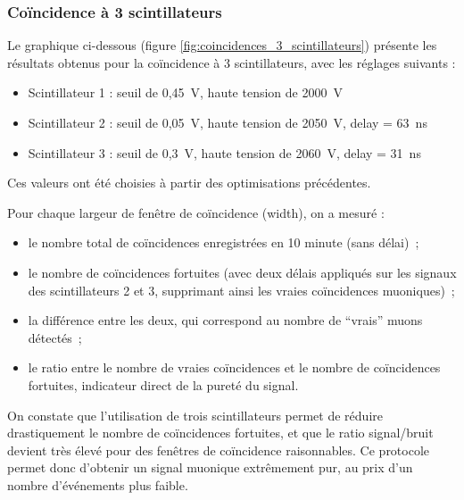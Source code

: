 \documentclass[a4paper,12pt,twoside]{article}
\begin{document}
\subsubsection{Coïncidence à 3 scintillateurs}

Le graphique ci-dessous (figure \ref{fig:coincidences_3_scintillateurs}) présente les résultats obtenus pour la coïncidence à 3 scintillateurs, avec les réglages suivants :
\begin{itemize}
    \item Scintillateur 1 : seuil de 0{,}45~V, haute tension de 2000~V
    \item Scintillateur 2 : seuil de 0{,}05~V, haute tension de 2050~V, delay = 63~ns
    \item Scintillateur 3 : seuil de 0{,}3~V, haute tension de 2060~V, delay = 31~ns
\end{itemize}
Ces valeurs ont été choisies à partir des optimisations précédentes.

Pour chaque largeur de fenêtre de coïncidence (width), on a mesuré :
\begin{itemize}
    \item le nombre total de coïncidences enregistrées en 10 minute (sans délai)~;
    \item le nombre de coïncidences fortuites (avec deux délais appliqués sur les signaux des scintillateurs 2 et 3, supprimant ainsi les vraies coïncidences muoniques)~;
    \item la différence entre les deux, qui correspond au nombre de “vrais” muons détectés~;
    \item le ratio entre le nombre de vraies coïncidences et le nombre de coïncidences fortuites, indicateur direct de la pureté du signal.
\end{itemize}

On constate que l’utilisation de trois scintillateurs permet de réduire drastiquement le nombre de coïncidences fortuites, et que le ratio signal/bruit devient très élevé pour des fenêtres de coïncidence raisonnables. Ce protocole permet donc d’obtenir un signal muonique extrêmement pur, au prix d’un nombre d’événements plus faible.
\end{document}
